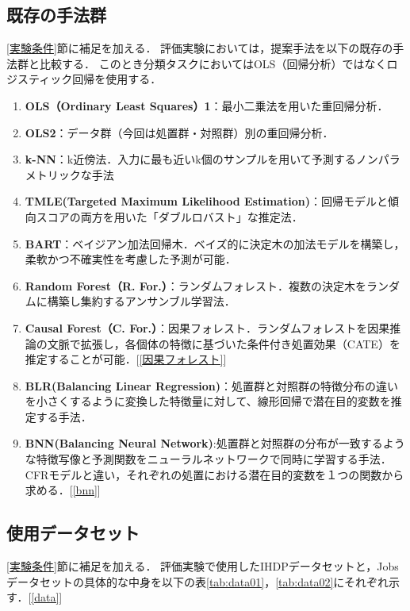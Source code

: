 \documentclass[dvipdfmx]{jreport}
\begin{document}
\subsection{既存の手法群}
\ref{実験条件}節に補足を加える．
評価実験においては，提案手法を以下の既存の手法群と比較する．
このとき分類タスクにおいてはOLS（回帰分析）ではなくロジスティック回帰を使用する．
\begin{tcolorbox}[title=\textbf{比較対象となる手法群}]
    \begin{enumerate}
        \item \textbf{OLS（Ordinary Least Squares）1}：最小二乗法を用いた重回帰分析．
        \item \textbf{OLS2}：データ群（今回は処置群・対照群）別の重回帰分析．
        \item \textbf{k-NN}：k近傍法．入力に最も近いk個のサンプルを用いて予測するノンパラメトリックな手法
        \item \textbf{TMLE(Targeted Maximum Likelihood Estimation)}：回帰モデルと傾向スコアの両方を用いた「ダブルロバスト」な推定法．
        \item \textbf{BART}：ベイジアン加法回帰木．ベイズ的に決定木の加法モデルを構築し，柔軟かつ不確実性を考慮した予測が可能．
        \item \textbf{Random Forest（R. For.）}：ランダムフォレスト．複数の決定木をランダムに構築し集約するアンサンブル学習法．
        \item \textbf{Causal Forest（C. For.）}：因果フォレスト．ランダムフォレストを因果推論の文脈で拡張し，各個体の特徴に基づいた条件付き処置効果（CATE）を推定することが可能．[\ref{因果フォレスト}]
        \item \textbf{BLR(Balancing Linear Regression)}：処置群と対照群の特徴分布の違いを小さくするように変換した特徴量に対して、線形回帰で潜在目的変数を推定する手法．
        \item \textbf{BNN(Balancing Neural Network)}:処置群と対照群の分布が一致するような特徴写像と予測関数をニューラルネットワークで同時に学習する手法．CFRモデルと違い，それぞれの処置における潜在目的変数を１つの関数から求める．[\ref{bnn}]
    \end{enumerate}
\end{tcolorbox}

\subsection{使用データセット}
\ref{実験条件}節に補足を加える．
評価実験で使用したIHDPデータセットと，Jobsデータセットの具体的な中身を以下の表\ref{tab:data01}，\ref{tab:data02}にそれぞれ示す．[\ref{data}]
\end{document}
